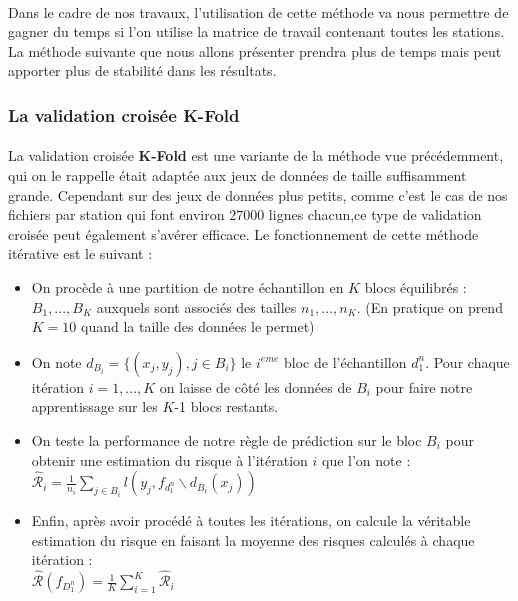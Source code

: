 \documentclass[14pt, openany]{article}
\begin{document}
\paragraph{}
Dans le cadre de nos travaux, l'utilisation de cette méthode va nous permettre de gagner du temps si l'on utilise la matrice de travail contenant toutes les stations. La méthode suivante que nous allons présenter prendra plus de temps mais peut apporter plus de stabilité dans les résultats.
\newpage
\subsubsection{La validation croisée K-Fold}
\paragraph{}
La validation croisée \textbf{K-Fold} est une variante de la méthode vue précédemment, qui on le rappelle était adaptée aux jeux de données de taille suffisamment grande. Cependant sur des jeux de données plus petits, comme c'est le cas de nos fichiers par station qui font environ $27000$ lignes chacun,ce type de validation croisée peut également s'avérer efficace. Le fonctionnement de cette méthode itérative est le suivant :
\begin{itemize}
\item On procède à une partition de notre échantillon en $K$ blocs équilibrés : $B_1,...,B_K$ auxquels sont associés des tailles $n_1,...,n_K$. (En pratique on prend $K=10$ quand la taille des données le permet)
\item On note $d_{B_i}=\{(x_j,y_j), j \in B_i\}$ le $i^{eme}$ bloc  de l'échantillon $d^{n}_{1}$. Pour chaque itération $i = 1,...,K$ on laisse de côté les données de $B_i$ pour faire notre apprentissage sur les $K$-1 blocs restants.
\item On teste la performance de notre règle de prédiction sur le bloc $B_i$ pour obtenir une estimation du risque à l'itération $i$ que l'on note : \\ $\widehat{\mathcal{R}}_i = \frac{1}{n_i} \sum\limits_{j \in B_i} l(y_j,f_{d^{n}_{1}} \backslash d_{B_i}(x_j))$
\item Enfin, après avoir procédé à toutes les itérations, on calcule la véritable estimation du risque en faisant la moyenne des risques calculés à chaque itération :\\
$\widehat{\mathcal{R}}(f_{D^{n}_{1}}) = \frac{1}{K} \sum\limits_{i=1}^K \widehat{\mathcal{R}}_i$
\end{itemize}
\end{document}
